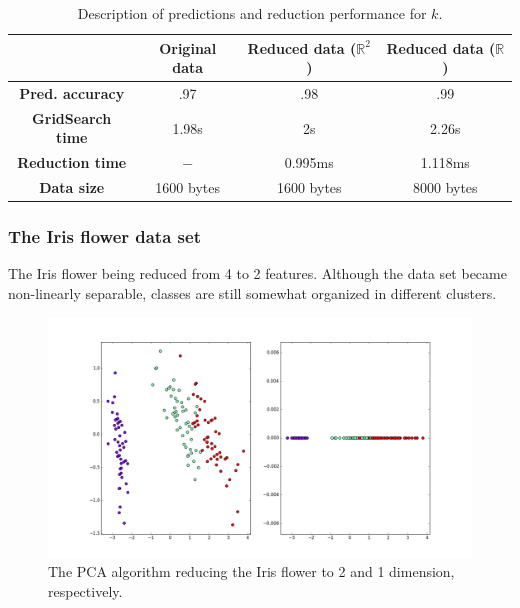\documentclass[12pt]{article}
\begin{document}
\begin{table}[H]
	\centering
	\begin{tabular}{|c|c|c|c|}
		\hline
		& \textbf{Original data} & \textbf{Reduced data ($\mathbb{R}^2$)} & \textbf{Reduced data ($\mathbb{R}$)} \\\hline
		\textbf{Pred. accuracy} & .97 & .98 & .99 \\\hline
		\textbf{GridSearch time} & 1.98s & 2s & 2.26s \\\hline
		\textbf{Reduction time} & $-$ & 0.995ms & 1.118ms \\\hline
		\textbf{Data size} & 1600 bytes & 1600 bytes & 8000 bytes \\\hline
	\end{tabular}

	\caption{Description of predictions and reduction performance for $k$.}
\end{table}

\subsubsection{The Iris flower data set}

The Iris flower being reduced from 4 to 2 features. Although the data set became non-linearly separable, classes are still somewhat organized in different clusters.

\begin{figure}[H]
	\centering
	\captionsetup{justification=centering}

	\includegraphics[width=\linewidth]{dsirispca}
	\caption{The PCA algorithm reducing the Iris flower to 2 and 1 dimension, respectively.}
	\label{fig:dsirispca}
\end{figure}
\end{document}
